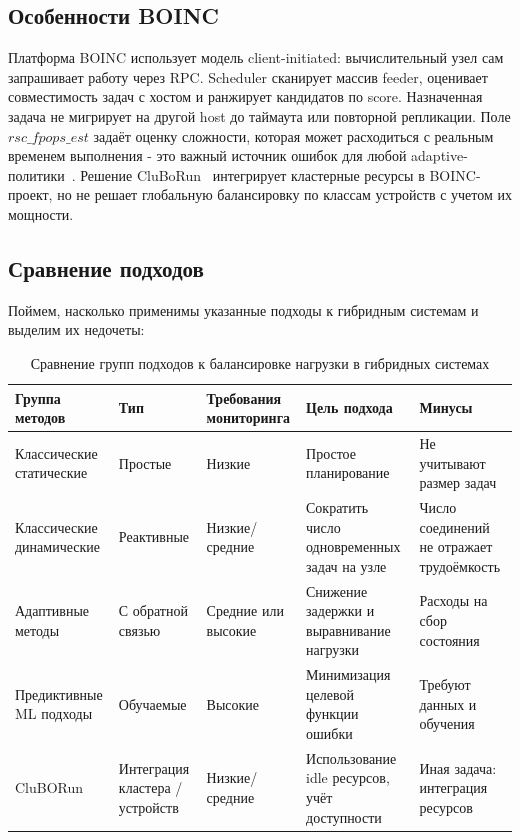 \documentclass[a4paper,12pt]{extarticle}
\begin{document}
\subsection{Особенности BOINC}
Платформа BOINC использует модель client-initiated: вычислительный узел сам запрашивает работу через RPC. Scheduler сканирует массив feeder, оценивает совместимость задач с хостом и ранжирует кандидатов по score. Назначенная задача не мигрирует на другой host до таймаута или повторной репликации. Поле $rsc\_fpops\_est$ задаёт оценку сложности, которая может расходиться с реальным временем выполнения - это важный источник ошибок для любой adaptive-политики~\cite{boinc-lb}. Решение CluBoRun~\cite{cluborun} интегрирует кластерные ресурсы в BOINC-проект, но не решает глобальную балансировку по классам устройств с учетом их мощности.

\subsection{Сравнение подходов}
Поймем, насколько применимы указанные подходы к гибридным системам и выделим их недочеты:
\begin{table}[H]
    \centering
    \caption{Сравнение групп подходов к балансировке нагрузки в гибридных системах}
    \footnotesize
    \begin{tabular}{p{3.4cm} p{2.0cm} p{2.6cm} p{2.4cm} p{2.4cm}}
    \hline
    Группа методов & Тип & Требования мониторинга & Цель подхода & Минусы \\
    \hline
    Классические статические & Простые & Низкие & Простое планирование & Не учитывают размер задач \\
    Классические динамические & Реактивные & Низкие/средние & Сократить число одновременных задач на узле & Число соединений не отражает трудоёмкость \\
    \hline
    Адаптивные методы & С обратной связью & Средние или высокие & Снижение задержки и выравнивание нагрузки & Расходы на сбор состояния \\
    \hline
    Предиктивные ML подходы & Обучаемые & Высокие & Минимизация целевой функции ошибки & Требуют данных и обучения \\
    \hline
    CluBORun & Интеграция кластера / устройств & Низкие/средние & Использование idle ресурсов, учёт доступности & Иная задача: интеграция ресурсов \\
    \hline
\end{tabular}
\end{table}
\end{document}
